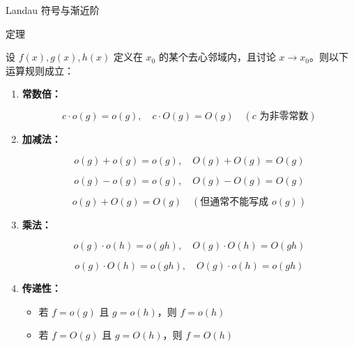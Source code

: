 \documentclass[aspectratio=169,10pt,fontset=fandol]{ctexbeamer}
\begin{document}
\begin{frame}[t,fragile]{Landau 符号与渐近阶}
\normalsize
\begin{block}{定理}
{\normalsize


设 \(f(x),g(x),h(x)\) 定义在 \(x_0\) 的某个去心邻域内，且讨论 \(x\to x_0\)。则以下运算规则成立：



\begin{enumerate}

\item \textbf{常数倍：}

   \[

   c \cdot o(g) = o(g),\quad c \cdot O(g) = O(g) \quad (c \text{ 为非零常数})

   \]



\item \textbf{加减法：}

   \[

   o(g) + o(g) = o(g),\quad O(g) + O(g) = O(g)

   \]

   \[

   o(g) - o(g) = o(g),\quad O(g) - O(g) = O(g)

   \]

   \[

   o(g) + O(g) = O(g) \quad (\text{但通常不能写成 } o(g))

   \]



\item \textbf{乘法：}

   \[

   o(g) \cdot o(h) = o(gh),\quad O(g) \cdot O(h) = O(gh)

   \]

   \[

   o(g) \cdot O(h) = o(gh),\quad O(g) \cdot o(h) = o(gh)

   \]



\item \textbf{传递性：}

   \begin{itemize}

   \item 若 \(f = o(g)\) 且 \(g = o(h)\)，则 \(f = o(h)\)

   \item 若 \(f = O(g)\) 且 \(g = O(h)\)，则 \(f = O(h)\)


\end{itemize}
\end{enumerate}}
\end{block}
\end{frame}
\end{document}
